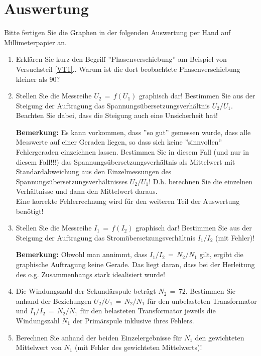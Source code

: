 \section{Auswertung} 

\begin{hint}
	Bitte fertigen Sie die Graphen in der folgenden Auswertung per Hand auf Millimeterpapier an.
\end{hint}

\begin{enumerate}
%
\item Erklären Sie kurz den Begriff ''Phasenverschiebung'' am Beispiel von Versuchsteil \ref{VT1}.. Warum ist die dort beobachtete Phasenverschiebung kleiner als 90\degree?
%
\item Stellen Sie die Messreihe $U_2\,=\,f(U_1)$ graphisch dar! Bestimmen Sie aus der Steigung der Auftragung das Spannungsübersetzungsverhältnis $U_2/U_1$. Beachten Sie dabei, dass die Steigung auch eine Unsicherheit hat!

	\noindent
	\textbf{Bemerkung:} Es kann vorkommen, dass ''so gut'' gemessen wurde, dass alle Messwerte auf einer Geraden liegen, so dass sich keine ''sinnvollen'' Fehlergeraden einzeichnen lassen. Bestimmen Sie in diesem Fall (und nur in
	diesem Fall!!!) das Spannungsübersetzungsverhältnis als Mittelwert mit Standardabweichung aus den Einzelmessungen des Spannungsübersetzungsverhältnisses $U_2/U_1$! D.h. berechnen Sie die einzelnen Verhältnisse und dann den Mittelwert daraus. \\
	Eine korrekte Fehlerrechnung wird für den weiteren Teil der Auswertung benötigt!
%
\item Stellen Sie die Messreihe $I_1\,=\,f(I_2)$ graphisch dar! Bestimmen Sie aus der Steigung der Auftragung das Stromübersetzungsverhältnis $I_1/I_2$ (mit Fehler)!

	\noindent
	\textbf{Bemerkung:} Obwohl man annimmt, dass $I_1/I_2\, =\,N_2/N_1$ gilt, ergibt die graphische Auftragung keine Gerade. Das liegt daran, dass bei der Herleitung des o.g. Zusammenhangs stark idealisiert wurde!
%
\item Die Windungszahl der Sekundärspule beträgt $N_2\,=\,72$. Bestimmen Sie anhand der Beziehungen $U_2/U_1\,=\,N_2/N_1$ für den unbelasteten Transformator und $I_1/I_2\,=\,N_2/N_1$ für den belasteten Transformator jeweils die Windungszahl $N_1$ der Primärspule inklusive ihres Fehlers.
%
\item Berechnen Sie anhand der beiden Einzelergebnisse für $N_1$ den gewichteten Mittelwert von $N_1$ (mit Fehler des gewichteten Mittelwerts)!
%
\end{enumerate}